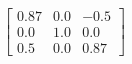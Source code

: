 \documentclass[preview]{standalone}
\begin{document}
\begin{align*}
\left[ \begin{array}{ccc}0.87 & 0.0 & -0.5 \\ 0.0 & 1.0 & 0.0 \\ 0.5 & 0.0 & 0.87\end{array} \right]
\end{align*}
\end{document}
